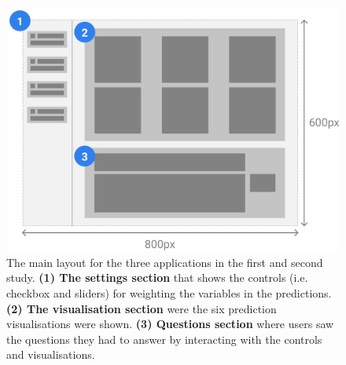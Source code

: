 \documentclass[final,5p,times,twocolumn,authoryear]{elsarticle}
\begin{document}










\begin{figure}
\centering
\includegraphics[width=0.75\columnwidth]{figures/whole-app-steps.png}
\caption{The main layout for the three applications in the first and second study. \textbf{(1) The settings section} that shows the controls (i.e. checkbox and sliders) for weighting the variables in the predictions. \textbf{(2) The visualisation section} were the six prediction visualisations were shown. \textbf{(3) Questions section} where users saw the questions they had to answer by interacting with the controls and visualisations.}\label{controls-dots-all}
\end{figure}
\end{document}
